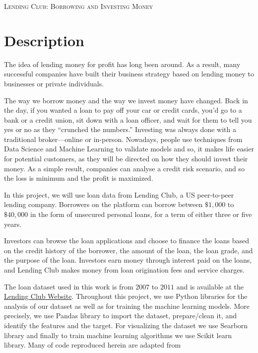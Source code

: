 \documentclass[a4paper,11pt]{amsart}
\begin{document}
\begin{tcolorbox}[center,colback=white]
\begin{center}
{\large\textsc{Lending Club: Borrowing and Investing Money}}\\
\end{center}
\end{tcolorbox}

\vspace{.1cm}

\section{Description}
The idea of lending money for profit has long been around. As a result, many successful companies have built their business strategy based on lending money to businesses or private individuals. 

\medbreak

The way we borrow money and the way we invest money have changed. Back in the day, if you wanted a loan to pay off your car or credit cards, you’d go to a bank or a credit union, sit down with a loan officer, and wait for them to tell you yes or no as they “crunched the numbers.” Investing was always done with a traditional broker—online or in-person. Nowadays, people use techniques from Data Science and Machine Learning to validate models and so, it makes life easier for potential customers, as they will be directed on how they should invest their money. As a simple result, companies can analyse a credit risk scenario, and so the loss is minimum and the profit is maximized. 

\medbreak

In this project, we will use loan data from Lending Club, a US peer-to-peer lending company. Borrowers on the platform can borrow between $\$1,000$ to $\$40,000$ in the form of unsecured personal loans, for a term of either three or five years.

\medbreak

Investors can browse the loan applications and choose to finance the loans based on the credit history of the borrower, the amount of the loan, the loan grade, and the purpose of the loan. Investors earn money through interest paid on the loans, and Lending Club makes money from loan origination fees and service charges.

\medbreak 

The loan dataset used in this work is from $2007$ to $2011$ and is available at the \href{https://www.lendingclub.com}{Lending Club Website}. Throughout this project, we use Python libraries for the analysis of our dataset as well as for training the machine learning models. More precisely, we use Pandas library to import the dataset, prepare/clean it, and identify the features and the target. For visualizing the dataset we use Searborn library and finally to train machine learning algorithms we use Scikit learn library. Many of code reproduced herein are adapted from 
\end{document}
